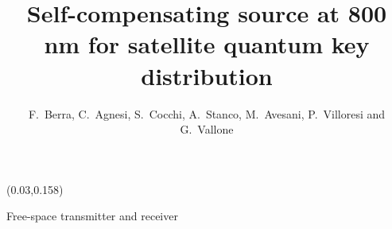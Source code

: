 \documentclass[final]{beamer}
\begin{document}
\title{{Self-compensating source at 800 nm for satellite quantum key distribution}}
\vskip-0.4cm
\author{ F.~Berra, C.~Agnesi, S.~Cocchi, A.~Stanco, M.~Avesani, P.~Villoresi and G.~Vallone}
\vskip0.4cm
\setlength{\TPHorizModule}{\linewidth}
\setlength{\TPVertModule}{\linewidth}

\begin{frame}

	\begin{textblock}{0.96}(0.03,0.158)
		\begin{block}{\large {Free-space transmitter and receiver}}
			\vskip 0.2cm
			\begin{columns}


\end{columns}
\end{block}
\end{textblock}
\end{frame}
\end{document}
